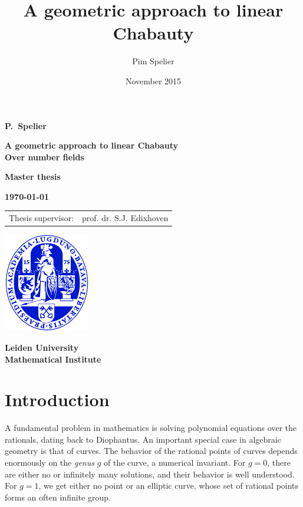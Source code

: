 \documentclass[12pt]{article}
\title{A geometric approach to linear Chabauty}
\author{Pim Spelier}
\date{November 2015}
\theoremstyle{plain}
\theoremstyle{definition}
\theoremstyle{remark}
\begin{document}

\vspace*{1em}

\begin{center}

{\Large\bf 
P.\ Spelier
} 

\vspace{1em} 

{\LARGE\bf 
A geometric approach to linear Chabauty\\
{\color{red} Over number fields}
} 

\vspace{8em} 

{\large\bf 
Master thesis
} 

\vspace{1em}

{\large\bf 
\today
}

\vspace{8em} 

{\large\bf
\begin{tabular}{ll}
Thesis supervisor: & prof. dr. S.J. Edixhoven\\
\end{tabular}
}
\vfill

\includegraphics{ulzegel_blauw}\\

\vspace{2em}

{\large\bf 
Leiden University\\
Mathematical Institute\\
}

\end{center}
\thispagestyle{empty}
\newpage
\tableofcontents
\newpage

\section{Introduction}
\label{section:intro}
A fundamental problem in mathematics is solving polynomial equations over the rationals, dating back to Diophantus. An important special case in algebraic geometry is that of curves. The behavior of the rational points of curves depends enormously on the \textit{genus} $g$ of the curve, a numerical invariant. For $g = 0$, there are either no or infinitely many solutions, and their behavior is well understood. For $g = 1$, we get either no point or an elliptic curve, whose set of rational points forms an often infinite group.
\end{document}
